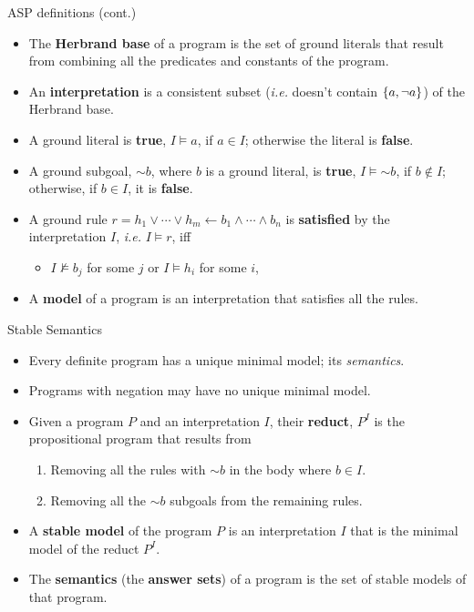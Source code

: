 \documentclass[bigger]{beamer}
\newcommand{\naf}{\ensuremath{\sim\!\!}}
\begin{document}
    \begin{frame}{ASP definitions \hfill(cont.)}
        \begin{itemize}\setcounter{enumi}{18}
            \item The \textbf{Herbrand base} of a program is the set of ground literals that result from combining all the predicates and constants of the program.
            \item An \textbf{interpretation} is a consistent subset (\emph{i.e.} doesn't contain $\set{a, \neg a}$) of the Herbrand base. 
            \item A ground literal is \textbf{true}, $I \models a$, if $a \in I$; otherwise the literal is \textbf{false}.
            \item A ground subgoal, $\naf b$, where $b$ is a ground literal, is \textbf{true}, $I \models \naf b$, if $b \not\in I$; otherwise, if $b \in I$,  it is \textbf{false}.
            \item A ground rule $r = h_1 \vee \cdots \vee h_m \leftarrow b_1 \wedge \cdots \wedge b_n$ is \textbf{satisfied} by the interpretation $I$, \emph{i.e.} $I \models r$, iff 
            \begin{itemize}
                \item $I \not\models b_j$ for some $j$ or $I \models h_i$ for some $i$,
            \end{itemize} 
            \item A \textbf{model} of a program is an interpretation that satisfies all the rules.
        \end{itemize}
    \end{frame}

    \begin{frame}{Stable Semantics}
        \begin{itemize}
            \item Every definite program has a unique minimal model; its \emph{semantics}.
            \item Programs with negation may have no unique minimal model.
            \item Given a program $P$ and an interpretation $I$, their \textbf{reduct}, $P^I$ is the propositional program that results from
            \begin{enumerate}
                \item Removing all the rules with $\naf b$ in the body where $b \in I$.
                \item Removing all the $\naf b$ subgoals from the remaining rules.
            \end{enumerate}
            \item A \textbf{stable model} of the program $P$ is an interpretation $I$ that is the minimal model of the reduct $P^I$.
            \item The \textbf{semantics} (the \textbf{answer sets}) of a program is the set of stable models of that program.
        \end{itemize}
    \end{frame}
\end{document}
